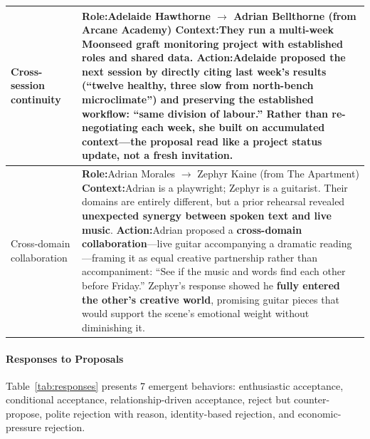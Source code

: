 \begin{table}[t]
\begin{tabular}{p{0.8in}p{4.3in}}
  Cross-session \newline continuity
  &
  \textbf{Role:}\quad Adelaide Hawthorne $\to$ Adrian Bellthorne \hfill (from Arcane Academy) \newline
  \textbf{Context:}\quad They run a multi-week Moonseed graft monitoring project with established roles and shared data. \newline
  \textbf{Action:}\quad Adelaide proposed the next session by \textbf{directly citing last week's results} (``twelve healthy, three slow from north-bench microclimate'') and \textbf{preserving the established workflow}: ``same division of labour.'' Rather than re-negotiating each week, she built on accumulated context---the proposal read like a project status update, not a fresh invitation.
  \\
  \midrule
  
  Cross-domain \newline collaboration
  &
  \textbf{Role:}\quad Adrian Morales $\to$ Zephyr Kaine \hfill (from The Apartment) \newline
  \textbf{Context:}\quad Adrian is a playwright; Zephyr is a guitarist. Their domains are entirely different, but a prior rehearsal revealed \textbf{unexpected synergy between spoken text and live music}. \newline
  \textbf{Action:}\quad Adrian proposed a \textbf{cross-domain collaboration}---live guitar accompanying a dramatic reading---framing it as equal creative partnership rather than accompaniment: ``See if the music and words find each other before Friday.'' Zephyr's response showed he \textbf{fully entered the other's creative world}, promising guitar pieces that would support the scene's emotional weight without diminishing it.
  \\
  \bottomrule
  \end{tabular}
  \end{table}

\paragraph{Responses to Proposals}
Table~\ref{tab:responses} presents 7 emergent behaviors:
enthusiastic acceptance, conditional acceptance, relationship-driven acceptance, reject but counter-propose, polite rejection with reason, identity-based rejection, and economic-pressure rejection.

